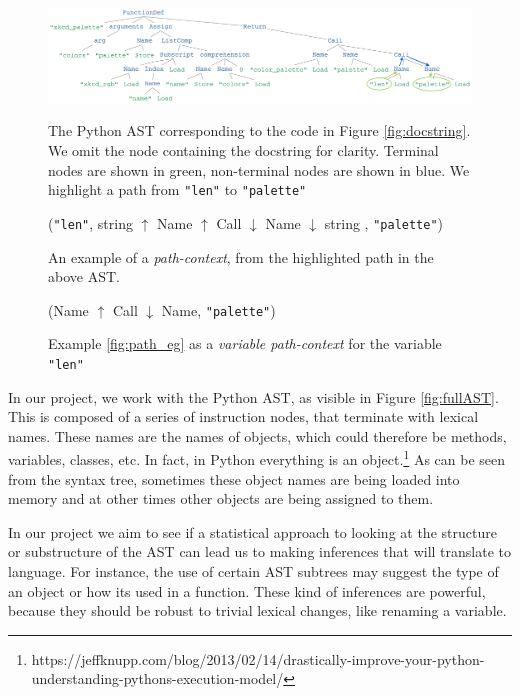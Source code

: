 \begin{figure}[tb]

    \centering
    \includegraphics[width=\linewidth]{ModelPics/xkcd_palette_strip_full_copy.png}
    \caption{The Python AST corresponding to the code in Figure \ref{fig:docstring}. We omit the node containing the docstring for clarity. Terminal nodes are shown in green, non-terminal nodes are shown in blue. We highlight a path from \texttt{"len"} to  \texttt{"palette"}}
    \label{fig:fullAST}

(\texttt{"len"}, string $\uparrow$ Name $\uparrow$ Call $\downarrow$ Name $\downarrow$ string ,  \texttt{"palette"})
    \caption{An example of a \textit{path-context}, from the highlighted path in the above AST.}
    \label{fig:path_eg}

    (Name $\uparrow$ Call $\downarrow$ Name,  \texttt{"palette"})
    \caption{Example \ref{fig:path_eg} as a \textit{variable path-context} for the variable \texttt{"len"}}
    \label{fig:varpath_eg}
\end{figure}


In our project, we work with the Python AST, as visible in Figure \ref{fig:fullAST}.
This is composed of a series of instruction nodes, that terminate with lexical names. 
These names are the names of objects, which could therefore be methods, variables, classes, etc. 
In fact, in Python everything is an object.\footnote{https://jeffknupp.com/blog/2013/02/14/drastically-improve-your-python-understanding-pythons-execution-model/} 
As can be seen from the syntax tree, sometimes these object names are being loaded into memory and at other times other objects are being assigned to them.

In our project we aim to see if a statistical approach to looking at the structure or substructure of the AST can lead us to making inferences that will translate to language. 
For instance, the use of certain AST subtrees may suggest the type of an object or how its used in a function.
These kind of inferences are powerful, because they should be robust to trivial lexical changes, like renaming a variable.

